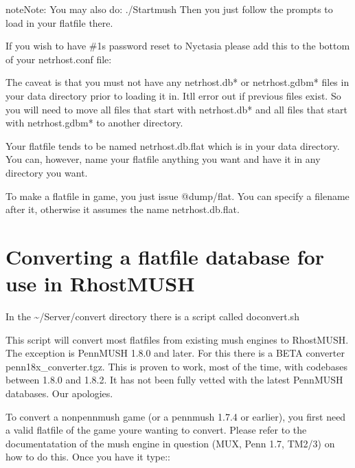 \documentclass[letterpaper,10pt,english]{sphinxmanual}
\begin{document}
\begin{sphinxadmonition}{note}{Note:}
\sphinxAtStartPar
You may also do: ./Startmush
Then you just follow the prompts to load in your flatfile there.
\end{sphinxadmonition}

\sphinxAtStartPar
If you wish to have \#1\textquotesingle{}s password reset to \textquotesingle{}Nyctasia\textquotesingle{} please add this
to the bottom of your netrhost.conf file:

\begin{sphinxVerbatim}[commandchars=\\\{\}]
 
\end{sphinxVerbatim}

\sphinxAtStartPar
The caveat is that you must not have any netrhost.db* or netrhost.gdbm* files
in your data directory prior to loading it in.  It\textquotesingle{}ll error out if previous
files exist.  So you will need to move all files that start with netrhost.db*
and all files that start with netrhost.gdbm* to another directory.

\sphinxAtStartPar
Your flatfile tends to be named \textquotesingle{}netrhost.db.flat\textquotesingle{} which is in your data
directory.  You can, however, name your flatfile anything you want and have
it in any directory you want.

\sphinxAtStartPar
To make a flatfile in game, you just issue @dump/flat.  You can specify
a filename after it, otherwise it assumes the name \textquotesingle{}netrhost.db.flat\textquotesingle{}.


\section{Converting a flatfile database for use in RhostMUSH}
\label{\detokenize{database:converting-a-flatfile-database-for-use-in-rhostmush}}
\sphinxAtStartPar
In the \textasciitilde{}/Server/convert directory there is a script called \textquotesingle{}doconvert.sh\textquotesingle{}

\sphinxAtStartPar
This script will convert most flatfiles from existing mush engines to
RhostMUSH.  The exception is PennMUSH 1.8.0 and later.  For this there is a
BETA converter penn18x\_converter.tgz.  This is proven to work, most of the time,
with codebases between 1.8.0 and 1.8.2.  It has not been fully vetted with
the latest PennMUSH databases.  Our apologies.

\sphinxAtStartPar
To convert a non\sphinxhyphen{}pennmush game (or a pennmush 1.7.4 or earlier), you first
need a valid flatfile of the game you\textquotesingle{}re wanting to convert.  Please refer
to the documentatation of the mush engine in question (MUX, Penn 1.7, TM2/3)
on how to do this.  Once you have it type::
\end{document}
